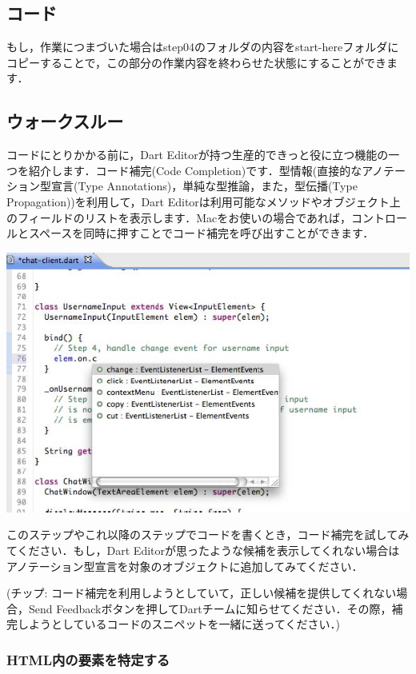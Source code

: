 \subsection{コード}

もし，作業につまづいた場合はstep04のフォルダの内容をstart-hereフォルダにコピーすることで，この部分の作業内容を終わらせた状態にすることができます．

\subsection{ウォークスルー}

コードにとりかかる前に，Dart Editorが持つ生産的できっと役に立つ機能の一つを紹介します．コード補完(Code Completion)です．型情報(直接的なアノテーション型宣言(Type Annotations)，単純な型推論，また，型伝播(Type Propagation))を利用して，Dart Editorは利用可能なメソッドやオブジェクト上のフィールドのリストを表示します．Macをお使いの場合であれば，コントロールとスペースを同時に押すことでコード補完を呼び出すことができます．

\includegraphics{step4/img_40.jpg}

このステップやこれ以降のステップでコードを書くとき，コード補完を試してみてください．もし，Dart Editorが思ったような候補を表示してくれない場合はアノテーション型宣言を対象のオブジェクトに追加してみてください．

(チップ: コード補完を利用しようとしていて，正しい候補を提供してくれない場合，Send Feedbackボタンを押してDartチームに知らせてください．その際，補完しようとしているコードのスニペットを一緒に送ってください．)

\subsubsection{HTML内の要素を特定する}


